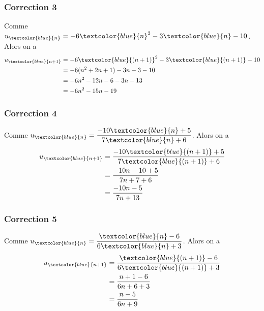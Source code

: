 \documentclass[15pt, mathserif]{beamer}
\begin{document}
\begin{frame}
\vspace{-10mm}
	\frametitle{Correction 3}
Comme $u_{\textcolor{blue}{n}}=-6{\textcolor{blue}{n}}^2-3{\textcolor{blue}{n}}-10$. Alors on a \begin{align*} 
 u_{{\textcolor{blue}{n+1}}} &=-6{\textcolor{blue}{(n+1)}}^2-3{\textcolor{blue}{(n+1)}}-10 \\ 
 &= -6(n^2+2n+1)-3n-3-10 \\ 
 &= -6n^2 -12n -6-3n-13\\ 
 &= -6n^2 -15n -19
 \end{align*}\end{frame}


\begin{frame}
\vspace{-10mm}
	\frametitle{Correction 4}
Comme $u_{\textcolor{blue}{n}}=\dfrac{-10\textcolor{blue}{n}+5}{7\textcolor{blue}{n}+6}$. Alors on a \begin{align*} 
 u_{\textcolor{blue}{n+1}} &=\dfrac{-10\textcolor{blue}{(n+1)}+5}{7\textcolor{blue}{(n+1)}+6} \\ 
 &= \dfrac{-10n-10+5}{7n+7+6} \\ 
 &= \dfrac{-10n-5}{7n+13}
 \end{align*}\end{frame}


\begin{frame}
\vspace{-10mm}
	\frametitle{Correction 5}
Comme $u_{\textcolor{blue}{n}}=\dfrac{\textcolor{blue}{n}-6}{6\textcolor{blue}{n}+3}$. Alors on a \begin{align*} 
 u_{\textcolor{blue}{n+1}} &=\dfrac{\textcolor{blue}{(n+1)}-6}{6\textcolor{blue}{(n+1)}+3} \\ 
 &= \dfrac{n+1-6}{6n+6+3} \\ 
 &= \dfrac{n-5}{6n+9}
 \end{align*}\end{frame}
\end{document}
